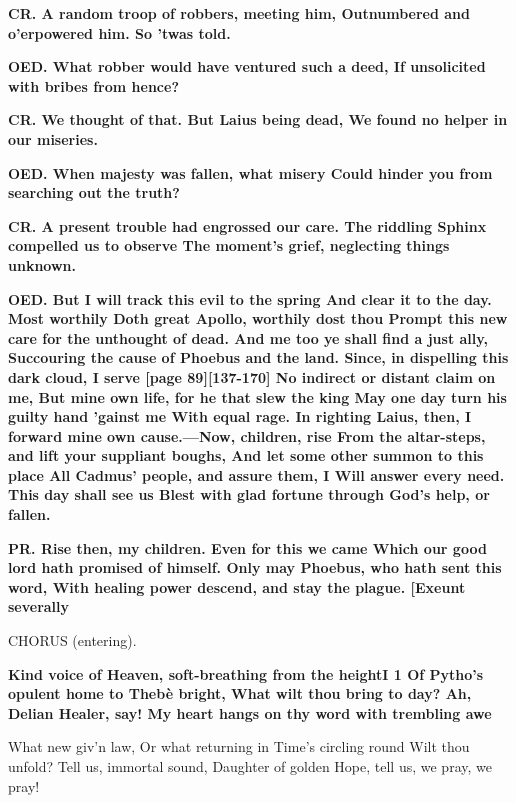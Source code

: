 \documentclass[11pt,letter]{book}
\begin{document}
\par \textbf{CR. A random troop of robbers, meeting him, Outnumbered and o’erpowered him. So ’twas told.}
\par 

\par \textbf{OED. What robber would have ventured such a deed, If unsolicited with bribes from hence?}
\par 

\par \textbf{CR. We thought of that. But Laius being dead, We found no helper in our miseries.}
\par 

\par \textbf{OED. When majesty was fallen, what misery Could hinder you from searching out the truth?}
\par 

\par \textbf{CR. A present trouble had engrossed our care. The riddling Sphinx compelled us to observe The moment’s grief, neglecting things unknown.}
\par 

\par \textbf{OED. But I will track this evil to the spring And clear it to the day. Most worthily Doth great Apollo, worthily dost thou Prompt this new care for the unthought of dead. And me too ye shall find a just ally, Succouring the cause of Phoebus and the land. Since, in dispelling this dark cloud, I serve [page 89][137-170] No indirect or distant claim on me, But mine own life, for he that slew the king May one day turn his guilty hand ’gainst me With equal rage. In righting Laius, then, I forward mine own cause.—Now, children, rise From the altar-steps, and lift your suppliant boughs, And let some other summon to this place All Cadmus’ people, and assure them, I Will answer every need. This day shall see us Blest with glad fortune through God’s help, or fallen.}
\par 

\par \textbf{PR. Rise then, my children. Even for this we came Which our good lord hath promised of himself. Only may Phoebus, who hath sent this word, With healing power descend, and stay the plague. [Exeunt severally}
\par 

\par  CHORUS (entering).

\par \textbf{Kind voice of Heaven, soft-breathing from the heightI 1 Of Pytho’s opulent home to Thebè bright, What wilt thou bring to day? Ah, Delian Healer, say! My heart hangs on thy word with trembling awe}
\par   What new giv’n law, Or what returning in Time’s circling round Wilt thou unfold? Tell us, immortal sound, Daughter of golden Hope, tell us, we pray, we pray!
\end{document}
